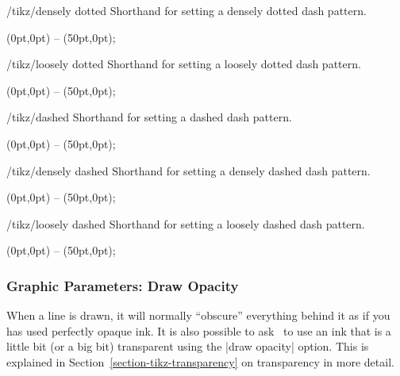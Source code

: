 \begin{stylekey}{/tikz/densely dotted}
  Shorthand for setting a densely dotted dash pattern.

\begin{codeexample}[]
\tikz {} (0pt,0pt) -- (50pt,0pt);
\end{codeexample}
\end{stylekey}

\begin{stylekey}{/tikz/loosely dotted}
  Shorthand for setting a loosely dotted dash pattern.

\begin{codeexample}[]
\tikz {} (0pt,0pt) -- (50pt,0pt);
\end{codeexample}
\end{stylekey}

\begin{stylekey}{/tikz/dashed}
  Shorthand for setting a dashed dash pattern.

\begin{codeexample}[]
\tikz \draw[dashed] (0pt,0pt) -- (50pt,0pt);
\end{codeexample}
\end{stylekey}

\begin{stylekey}{/tikz/densely dashed}
  Shorthand for setting a densely dashed dash pattern.

\begin{codeexample}[]
\tikz {} (0pt,0pt) -- (50pt,0pt);
\end{codeexample}
\end{stylekey}

\begin{stylekey}{/tikz/loosely dashed}
  Shorthand for setting a loosely dashed dash pattern.

\begin{codeexample}[]
\tikz {} (0pt,0pt) -- (50pt,0pt);
\end{codeexample}
\end{stylekey}


\subsubsection{Graphic Parameters: Draw Opacity}

When a line is drawn, it will normally ``obscure'' everything behind
it as if you has used perfectly opaque ink. It is also possible to ask
\tikzname\ to use an ink that is a little bit (or a big bit)
transparent using the |draw opacity| option. This is explained in
Section~\ref{section-tikz-transparency} on transparency in more detail.



